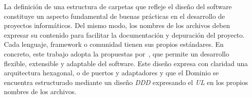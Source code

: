 La definición de una estructura de carpetas que refleje el diseño del software constituye un aspecto fundamental de buenas prácticas en el desarrollo de proyectos informáticos.
Del mismo modo, los nombres de los archivos deben expresar su contenido para facilitar la documentación y depuración del proyecto.
Cada lenguaje, framework o comunidad tienen sus propios estándares.
En concreto, este trabajo adopta la propuestas por~\cite{TomHombergs2019GYHD}, que permite un desarrollo flexible, extensible y adaptable del software.
Este diseño expresa con claridad una arquitectura hexagonal, o de puertos y adaptadores y que el Dominio se encuentra estructurado mediante un diseño \textit{DDD} expresando el \textit{UL} en los propios nombres de los archivos.



